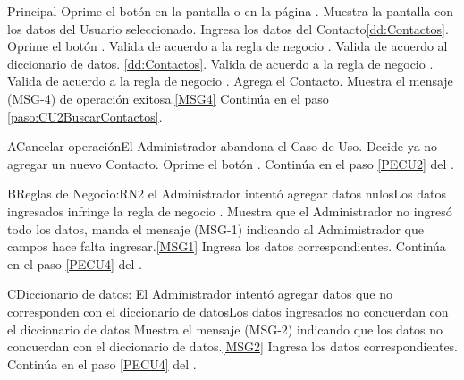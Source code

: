 	\begin{UCtrayectoria}{Principal}
			\UCpaso[\UCactor] Oprime el botón  en la pantalla  o en la página .
			\UCpaso Muestra la pantalla  con los datos del Usuario seleccionado. 
                        \UCpaso [\UCactor] Ingresa los datos  del Contacto\ref{dd:Contactos}.\label{paso:CU2ValidacionDatosEditarContactos}
                       	\UCpaso [\UCactor] Oprime el botón .\label{PECU4}
                        \UCpaso Valida de acuerdo a la regla de negocio .  
                        \UCpaso Valida de acuerdo al diccionario de datos. \ref{dd:Contactos}.
                        \UCpaso Valida de acuerdo a la regla de negocio . 
			\UCpaso Valida de acuerdo a la regla de negocio .   
			\UCpaso Agrega el Contacto.
			\UCpaso Muestra el mensaje (MSG-4) de operación exitosa.\ref{MSG4}
                        \UCpaso Continúa en el paso \ref{paso:CU2BuscarContactos}.
	\end{UCtrayectoria}

	\begin{UCtrayectoriaA}{A}{Cancelar operación}{El Administrador abandona el Caso de Uso.}
			\UCpaso[\UCactor] Decide ya no agregar un nuevo Contacto.
			\UCpaso[\UCactor] Oprime el botón .
			\UCpaso Continúa en el paso \ref{PECU2} del .
	\end{UCtrayectoriaA}

        \begin{UCtrayectoriaA}{B}{Reglas de Negocio:RN2 el Administrador intentó agregar datos nulos}{Los datos ingresados infringe la regla de negocio .}
                        \UCpaso Muestra que el Administrador no ingresó todo los datos, manda el mensaje (MSG-1) indicando al Admimistrador que campos hace falta ingresar.\ref{MSG1}
			\UCpaso[\UCactor] Ingresa los datos correspondientes.
			\UCpaso Continúa en el paso \ref{PECU4} del .
	\end{UCtrayectoriaA}

        \begin{UCtrayectoriaA}{C}{Diccionario de datos: El Administrador intentó agregar datos que no corresponden con el diccionario de datos}{Los datos ingresados no concuerdan con el diccionario de datos}
                        \UCpaso Muestra el mensaje (MSG-2) indicando que los datos no concuerdan con el diccionario de datos.\ref{MSG2}
			\UCpaso[\UCactor] Ingresa los datos correspondientes.
			\UCpaso Continúa en el paso \ref{PECU4} del .
	\end{UCtrayectoriaA}

